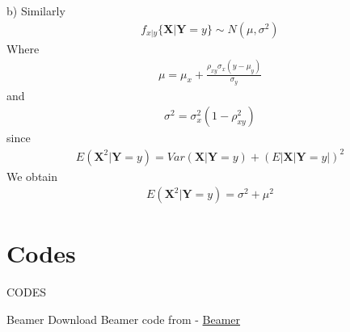 \documentclass{beamer}
\begin{document}
\begin{frame}
    b) Similarly 
    \begin{align}
        f_{x|y}\{\textbf{X}|\textbf{Y}=y\} \sim N(\mu,\sigma^2)
    \end{align}
    Where
    \begin{align}
        \mu = \mu_x +\frac{\rho_{xy}\sigma_x(y-\mu_y)}{\sigma_y}
    \end{align}
    and 
    \begin{align}
        \sigma^2 = \sigma_x^2(1-\rho_{xy}^2)
    \end{align}
    since
    \begin{align}
        E(\textbf{X}^2|\textbf{Y}=y) = Var(\textbf{X}|\textbf{Y}=y) + (E|\textbf{X}|\textbf{Y}=y|)^2
    \end{align}
    We obtain
    \begin{align}
        E(\textbf{X}^2|\textbf{Y}=y) = \sigma^2 + \mu^2
    \end{align}
\end{frame}

\section{Codes}
\begin{frame}{CODES}

 \begin{block}{Beamer}
         Download Beamer code from - \href{}{Beamer}
    \end{block}
\end{frame} 
\end{document}
